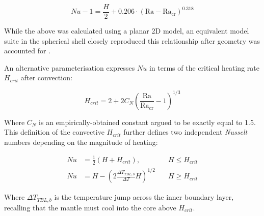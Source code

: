 \begin{equation}
Nu - 1 = \frac{H}{2} + 0.206 \cdot {\left( \mathrm{Ra} - {\mathrm{Ra}}_{\mathrm{cr}} \right)}^{0.318}
\end{equation}

While the above was calculated using a planar 2D model, an equivalent model suite in the spherical shell closely reproduced this relationship after geometry was accounted for \cite{Weller2016-nm}.

An alternative parameterisation \cite{Vilella2018-il} expresses $Nu$ in terms of the critical heating rate $H_{crit}$ after convection:

\begin{equation}
H_{crit} = 2 + 2 C_N {\left( \frac{\mathrm{Ra}}{{\mathrm{Ra}}_{\mathrm{cr}}} - 1 \right)}^{1/3}
\end{equation}

Where $C_N$ is an empirically-obtained constant argued to be exactly equal to 1.5. This definition of the convective $H_{crit}$ further defines two independent \textit{Nusselt} numbers depending on the magnitude of heating:

\begin{align*}
Nu &= \frac{1}{2} \left( H + H_{crit} \right), \quad &H \le H_{crit} \\
Nu &=  H - {\left( 2 \frac{{\Delta T}_{TBL,b}}{\Delta T} H \right)}^{1/2} \quad &H \ge H_{crit}
\end{align*}

Where ${\Delta T}_{TBL,b}$ is the temperature jump across the inner boundary layer, recalling that the mantle must cool into the core above $H_{crit}$.